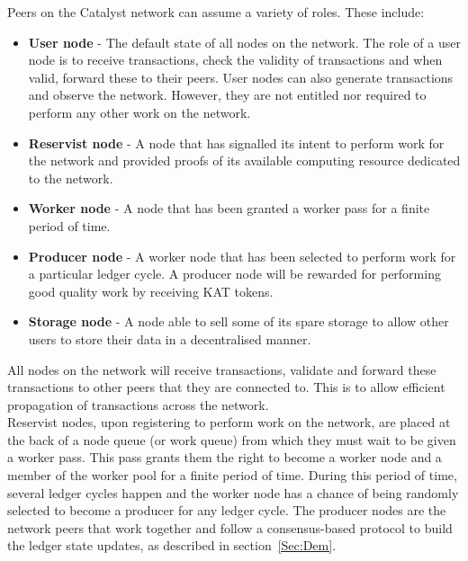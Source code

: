 Peers on the Catalyst network can assume a variety of roles. These include:

\begin{itemize}

\item \textbf{User node} - The default state of all nodes on the network. The role of a user node is to receive transactions, check the  validity of transactions and when valid, forward these to their peers. User nodes can also generate transactions and observe the network. However, they are not entitled nor required to perform any other work on the network. 

\item \textbf{Reservist node} - A node that has signalled its intent to perform work for the network and provided proofs of its available computing resource dedicated to the network.

\item \textbf{Worker node} - A node that has been granted a worker pass for a finite period of time. 

\item \textbf{Producer node} - A worker node that has been selected to perform work for a particular ledger cycle. A producer node will be rewarded for performing good quality work by receiving KAT tokens. 

\item \textbf{Storage node} - A node able to sell some of its spare storage to allow other users to store their data in a decentralised manner. 

\end{itemize}

All nodes on the network will receive transactions, validate and forward these transactions to other peers that they are connected to. This is to allow efficient propagation of transactions across the network. \\

Reservist nodes, upon registering to perform work on the network, are placed at the back of a node queue (or work queue) from which they must wait to be given a worker pass. This pass grants them the right to become a worker node and a member of the worker pool for a finite period of time. During this period of time, several ledger cycles happen and the worker node has a chance of being randomly selected to become a producer for any ledger cycle. The producer nodes are the network peers that work together and follow a consensus-based protocol to build the ledger state updates, as described in section~\ref{Sec:Dem}. 